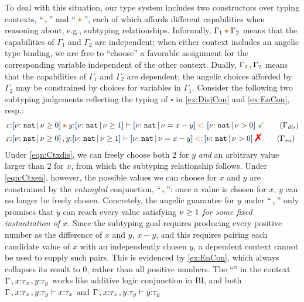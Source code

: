 To deal with this situation, our type system includes two constructors
over typing contexts, ``$\ctcomma$'' and ``$\ctstar$'', each of which
affords different capabilities when reasoning about, e.g., subtyping
relationships. Informally, $\Gamma_1 \ctstar \Gamma_2$ means that the
capabilities of $\Gamma_1$ and $\Gamma_2$ are independent; when either
context includes an angelic type binding, we are free to ``choose'' a
favorable assignment for the corresponding variable independent of the
other context.  Dually, $\Gamma_1 \ctcomma \Gamma_2$ means that the
capabilities of $\Gamma_1$ and $\Gamma_2$ are dependent; the angelic
choices afforded by $\Gamma_2$ may be constrained by choices for
variables in $\Gamma_1$.  Consider the following two subtyping
judgements reflecting the typing of $\square $ in \ref{ex:DisjCon}
and \ref{ex:EnCon}, resp.:
\vspace{-0.2em}
\begin{align*}
  &x{:}\urt{\Nat}{\vnu \geq 0} \ctstar y{:}\urt{\Nat}{\vnu \geq 1}
    \vdash \urt{\Nat}{\vnu = x - y} \subty \urt{\Nat}{\vnu > 0}
    \;\judgok \tag{$\Gamma_\mathit{dis}$}\label{eqn:Ctxdis} \\
  &x{:}\urt{\Nat}{\vnu \geq 0} \ctcomma y{:}\urt{\Nat}{\vnu \geq 1}
    \vdash \urt{\Nat}{\vnu = x - y} \subty \urt{\Nat}{\vnu > 0} \;\judgfail
    \tag{$\Gamma_\mathit{en}$}\label{eqn:Ctxen}
\end{align*}\noindent
Under \ref{eqn:Ctxdis}, we can freely choose both $2$ for $y$
\emph{and} an arbitrary value larger than $2$ for $x$, from which the
subtyping relationship follows. Under \ref{eqn:Ctxen}, however, the
possible values we can choose for $x$ and $y$ are constrained by the
\emph{entangled} conjunction, ``$\ctcomma$'': once a value is chosen
for $x$, $y$ can no longer be freely chosen. Concretely, the angelic
guarantee for $y$ under ``$\ctcomma$'' only promises that $y$ can
reach every value satisfying $\nu \geq 1$ \emph{for some fixed
  instantiation of $x$}.  Since the subtyping goal requires producing
every positive number as the difference of $x$ and $y$, $x - y$, and
this requires pairing each candidate value of $x$ with an
independently chosen $y$, a dependent context cannot be used to supply
such pairs.  This is evidenced by \ref{ex:EnCon}, which always collapses its
result to 0, rather than all positive numbers.  The ``\ctcomma'' in
the context $\Gamma \ctcomma x{:}\tau_x \ctcomma y{:}\tau_y$ works
like additive logic conjunction in BI, and both
$\Gamma\ctcomma x{:}\tau_x \ctcomma y{:}\tau_y \vdash x{:}\tau_x$
and
$\Gamma\ctcomma x{:}\tau_x \ctcomma y{:}\tau_y \vdash y{:}\tau_y$
